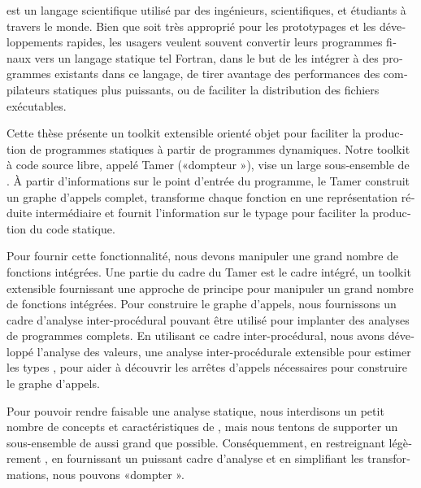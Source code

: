 \begin{otherlanguage}{french}
\matlab est un langage scientifique utilisé par des ingénieurs,
scientifiques, et étudiants à travers le monde. Bien que \matlab soit
très approprié pour les prototypages et les développements rapides, les
usagers veulent souvent convertir leurs programmes \matlab finaux vers
un langage statique tel {\sc Fortran}, dans le but de les intégrer à
des programmes existants dans ce langage, de tirer avantage des
performances des compilateurs statiques plus puissants, ou de faciliter
la distribution des fichiers exécutables.

Cette thèse présente un toolkit extensible orienté objet pour
faciliter la production de programmes statiques à partir de programmes
\matlab dynamiques. Notre toolkit à code source libre, appelé \matlab
  Tamer («dompteur \matlab»), vise un large sous-ensemble de
\matlab. À partir d'informations sur le point d'entrée du programme,
le \matlab Tamer construit un graphe d'appels complet, transforme
chaque fonction en une représentation réduite intermédiaire et fournit
l'information sur le typage pour faciliter la production du code
statique.

Pour fournir cette fonctionnalité, nous devons manipuler une grand
nombre de fonctions \matlab intégrées. Une partie du cadre du Tamer
est le cadre intégré, un toolkit extensible fournissant une approche
de principe pour manipuler un grand nombre de fonctions
intégrées. Pour construire le graphe d'appels, nous fournissons un
cadre d'analyse inter-procédural pouvant être utilisé pour implanter
des analyses de programmes complets. En utilisant ce cadre
inter-procédural, nous avons développé l'analyse des valeurs, une
analyse inter-procédurale extensible pour estimer les types \matlab,
pour aider à découvrir les arrêtes d'appels nécessaires pour
construire le graphe d'appels.

Pour pouvoir rendre faisable une analyse statique, nous interdisons un
petit nombre de concepts et caractéristiques de \matlab, mais nous
tentons de supporter un sous-ensemble de \matlab aussi grand que
possible. Conséquemment, en restreignant légèrement \matlab, en
fournissant un puissant cadre d'analyse et en simplifiant les
transformations, nous pouvons «dompter \matlab».

\end{otherlanguage}

